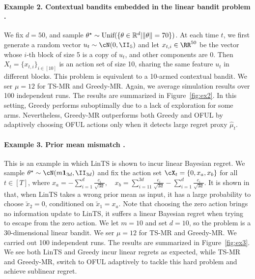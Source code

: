 \paragraph{Example 2. Contextual bandits embedded in the linear bandit problem  \citep{abbasi2013online}.} We fix $d = 50$, and sample $\theta^\star\sim\text{Unif}(\{\theta \in \mathbb{R}^d|\|\theta\|= 70\}) $. At each time $t$, we first  generate a random vector $u_t \sim \cN(0, \II_5)$ and let $x_{t,i}\in \RR^{50}$ be the vector whose $i$-th block of size 5 is a  copy of $u_t$, and other components are 0. Then $X_t = \{x_{t,i}\}_{i\in [10] }$ is an action set of size 10, sharing the same feature $u_t$ in different blocks. This problem is equivalent to a 10-armed contextual bandit. We ser $\mu = 12$ for TS-MR and Greedy-MR. Again, we average simulation results over 100 independent runs. The results are summarized in Figure~\ref{fig:ex2}. In this setting, Greedy performs suboptimally due to a lack of exploration for some arms. Nevertheless, Greedy-MR outperforms both Greedy and OFUL by adaptively choosing OFUL actions only when it detects large regret proxy $\hat{\mu}_t$.  



\paragraph{Example 3. Prior mean mismatch \citep{hamidi2020frequentist}.} This is an example in which LinTS is shown to incur linear Bayesian regret. We sample $\theta^\star \sim \cN(m \mathbf{1}_{3d}, \II_{3d})$ and fix the action set $\cX_t = \{0, x_a, x_b\}$ for all $t\in[T]$, where $x_a = - \sum_{i=1}^{d} \frac{e_i}{\sqrt{3d}},  \quad x_b = \sum_{i=11}^{3d} \frac{e_i}{\sqrt{3d}}  - \sum_{i=1}^{d} \frac{e_i}{\sqrt{3d}}$.
It is shown in \cite{hamidi2020frequentist} that, when LinTS takes a wrong prior mean as input,  it has a large probability to choose  $\tilde{x}_2 = 0$, conditioned on $\tilde{x}_1 = x_a$. Note that choosing the zero action brings no information update to LinTS, it suffers a linear Bayesian regret when trying to escape from the zero action. We let $m = 10$ and set $d = 10$, so the problem is a $30$-dimensional linear bandit. We ser $\mu = 12$ for TS-MR and Greedy-MR. We carried out 100 independent runs. The results are summarized in Figure~\ref{fig:ex3}. We see both LinTS and Greedy incur linear regrets as expected, while TS-MR and Greedy-MR, switch to OFUL adaptively to tackle this hard problem  and achieve sublinear regret.



